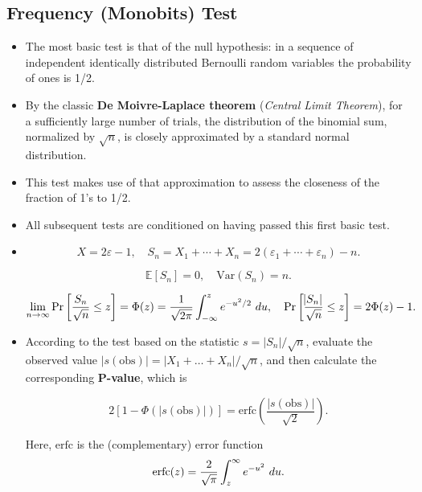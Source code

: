 \documentclass[12pt,openany]{book}
\theoremstyle{definition}
\begin{document}
	\subsection{Frequency (Monobits) Test}
	
	\begin{itemize}
		\item The most basic test is that of the null hypothesis: in a sequence of independent identically distributed Bernoulli random variables the probability of ones is 1/2.
		\item By the classic \textbf{De Moivre-Laplace theorem} (\textit{Central Limit Theorem}), for a sufficiently large number of trials, the distribution of the binomial sum, normalized by $\sqrt{n}$, is closely approximated by a standard normal distribution.
		\item This test makes use of that approximation to assess the closeness of the fraction of 1's to 1/2.
		\item All subsequent tests are conditioned on having passed this first basic test.
		\item 
		\[
		X = 2\varepsilon-1, \quad S_n = X_1 + \cdots + X_n = 2(\varepsilon_1 + \cdots + \varepsilon_n) - n.
		\]
		
		\[
		\mathbb{E}[S_n] = 0, \quad \text{Var}(S_n) = n.
		\]
		
		\[
		\lim\limits_{n\to\infty}\Pr\sbr{\frac{S_n}{\sqrt{n}}\leq z}=\Phi(z)=\frac{1}{\sqrt{2\pi}}\int_{-\infty}^{z}e^{-u^2/2}\ du,\quad \Pr\sbr{\frac{\abs{S_n}}{\sqrt{n}}\leq z}=2\Phi(z)-1.
		\]
		
		\item According to the test based on the statistic $s = |S_n|/\sqrt{n}$, evaluate the observed value $|s(\text{obs})| = |X_1 + \ldots + X_n|/\sqrt{n}$, and then calculate the corresponding \textbf{P-value}, which is
		
		\[
		2\left[1 - \Phi\left({|s(\text{obs})|}\right)\right] = \text{erfc}\left(\frac{|s(\text{obs})|}{\sqrt{2}}\right).
		\]
		
		Here, $\text{erfc}$ is the (complementary) error function \[
		\textnormal{erfc}(z)=\frac{2}{\sqrt{\pi}}\int_{z}^{\infty}e^{-u^2}\ du.
		\]
	\end{itemize}
\end{document}
